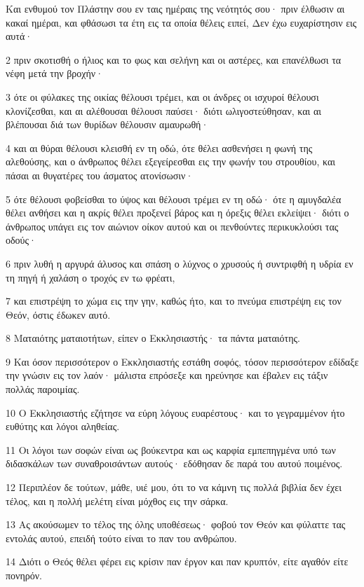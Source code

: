\par Και ενθυμού τον Πλάστην σου εν ταις ημέραις της νεότητός σου· πριν έλθωσιν αι κακαί ημέραι, και φθάσωσι τα έτη εις τα οποία θέλεις ειπεί, Δεν έχω ευχαρίστησιν εις αυτά·
\par 2 πριν σκοτισθή ο ήλιος και το φως και σελήνη και οι αστέρες, και επανέλθωσι τα νέφη μετά την βροχήν·
\par 3 ότε οι φύλακες της οικίας θέλουσι τρέμει, και οι άνδρες οι ισχυροί θέλουσι κλονίζεσθαι, και αι αλέθουσαι θέλουσι παύσει· διότι ωλιγοστεύθησαν, και αι βλέπουσαι διά των θυρίδων θέλουσιν αμαυρωθή·
\par 4 και αι θύραι θέλουσι κλεισθή εν τη οδώ, ότε θέλει ασθενήσει η φωνή της αλεθούσης, και ο άνθρωπος θέλει εξεγείρεσθαι εις την φωνήν του στρουθίου, και πάσαι αι θυγατέρες του άσματος ατονίσωσιν·
\par 5 ότε θέλουσι φοβείσθαι το ύψος και θέλουσι τρέμει εν τη οδώ· ότε η αμυγδαλέα θέλει ανθήσει και η ακρίς θέλει προξενεί βάρος και η όρεξις θέλει εκλείψει· διότι ο άνθρωπος υπάγει εις τον αιώνιον οίκον αυτού και οι πενθούντες περικυκλούσι τας οδούς·
\par 6 πριν λυθή η αργυρά άλυσος και σπάση ο λύχνος ο χρυσούς ή συντριφθή η υδρία εν τη πηγή ή χαλάση ο τροχός εν τω φρέατι,
\par 7 και επιστρέψη το χώμα εις την γην, καθώς ήτο, και το πνεύμα επιστρέψη εις τον Θεόν, όστις έδωκεν αυτό.
\par 8 Ματαιότης ματαιοτήτων, είπεν ο Εκκλησιαστής· τα πάντα ματαιότης.
\par 9 Και όσον περισσότερον ο Εκκλησιαστής εστάθη σοφός, τόσον περισσότερον εδίδαξε την γνώσιν εις τον λαόν· μάλιστα επρόσεξε και ηρεύνησε και έβαλεν εις τάξιν πολλάς παροιμίας.
\par 10 Ο Εκκλησιαστής εζήτησε να εύρη λόγους ευαρέστους· και το γεγραμμένον ήτο ευθύτης και λόγοι αληθείας.
\par 11 Οι λόγοι των σοφών είναι ως βούκεντρα και ως καρφία εμπεπηγμένα υπό των διδασκάλων των συναθροισάντων αυτούς· εδόθησαν δε παρά του αυτού ποιμένος.
\par 12 Περιπλέον δε τούτων, μάθε, υιέ μου, ότι το να κάμνη τις πολλά βιβλία δεν έχει τέλος, και η πολλή μελέτη είναι μόχθος εις την σάρκα.
\par 13 Ας ακούσωμεν το τέλος της όλης υποθέσεως· φοβού τον Θεόν και φύλαττε τας εντολάς αυτού, επειδή τούτο είναι το παν του ανθρώπου.
\par 14 Διότι ο Θεός θέλει φέρει εις κρίσιν παν έργον και παν κρυπτόν, είτε αγαθόν είτε πονηρόν.


